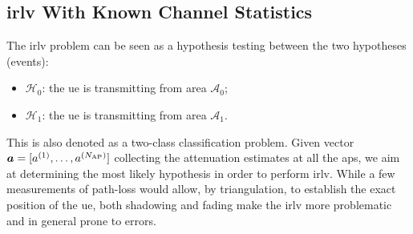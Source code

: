 \documentclass[draftcls,onecolumn,12pt]{IEEEtran}
\begin{document}
{\subsection{\ac{irlv} With Known Channel Statistics}\label{sec:auth}

The \ac{irlv} problem can be seen as a hypothesis testing between the two hypotheses (events):
\begin{itemize}
    \item $\mathcal{H}_0$: the \ac{ue} is transmitting from area $\mathcal{A}_0$;
    \item $\mathcal{H}_1$: the \ac{ue} is transmitting from area $\mathcal{A}_1$.
\end{itemize}
This is also denoted as a two-class classification problem. Given vector $\bm{a} = [a^{(1)}, \ldots, a^{(N_{\rm AP})}]$ collecting the attenuation estimates at all the \acp{ap}, we aim  at determining the most likely hypothesis in order to perform \ac{irlv}. While a few measurements of path-loss would allow, by triangulation, to establish the exact position of the \ac{ue}, both shadowing and fading make the \ac{irlv} more problematic and in general prone to errors. 


}
\end{document}
